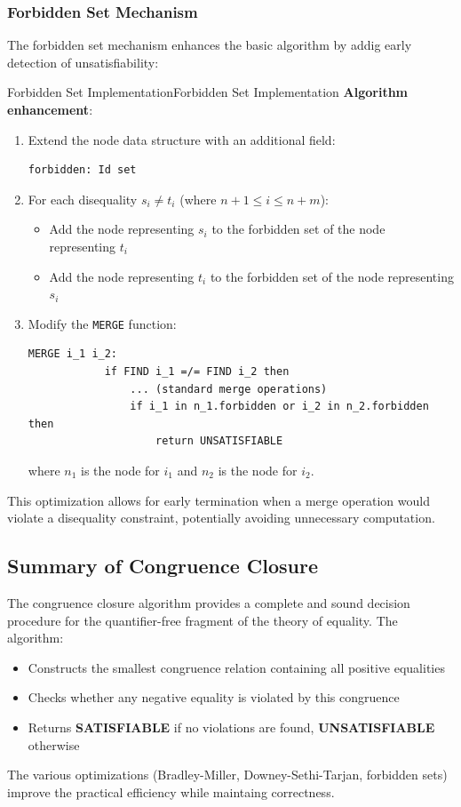 \documentclass[a4paper]{article}
\theoremstyle{definition}
\begin{document}
\subsubsection{Forbidden Set Mechanism}
The forbidden set mechanism enhances the basic algorithm by addig early detection of unsatisfiability:
\begin{definition}{Forbidden Set Implementation}{Forbidden Set Implementation}
\textbf{Algorithm enhancement}:
\begin{enumerate}
	\item Extend the node data structure with an additional field:
	\begin{lstlisting}[style=ocamlpseudo]
		forbidden: Id set
	\end{lstlisting}
	\item For each disequality \( s_i \neq t_i \) (where $n + 1 \leq i \leq n + m$):
	\begin{itemize}
		\item Add the node representing \( s_i \) to the forbidden set of the node representing \( t_i \)   
		\item Add the node representing \( t_i \) to the forbidden set of the node representing \( s_i \)
	\end{itemize}
	\item Modify the \texttt{MERGE} function:
	\begin{lstlisting}[style=ocamlpseudo]
		MERGE i_1 i_2:
			if FIND i_1 =/= FIND i_2 then 
				... (standard merge operations)
				if i_1 in n_1.forbidden or i_2 in n_2.forbidden then 
					return UNSATISFIABLE
	\end{lstlisting}
	where \( n_1 \) is the node for \( i_1 \) and \( n_2 \) is the node for \( i_2 \).
\end{enumerate}
\end{definition}
This optimization allows for early termination when a merge operation would violate a disequality constraint, potentially 
avoiding unnecessary computation.
\subsection{Summary of Congruence Closure}
The congruence closure algorithm provides a complete and sound decision procedure for the quantifier-free 
fragment of the theory of equality. The algorithm:
\begin{itemize}
	\item Constructs the smallest congruence relation containing all positive equalities 
	\item Checks whether any negative equality is violated by this congruence 
	\item Returns \textbf{SATISFIABLE} if no violations are found, \textbf{UNSATISFIABLE} otherwise
\end{itemize}
The various optimizations (Bradley-Miller, Downey-Sethi-Tarjan, forbidden sets) improve the practical efficiency 
while maintaing correctness.
\end{document}
